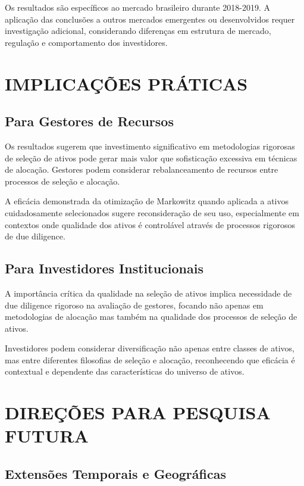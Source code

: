 Os resultados são específicos ao mercado brasileiro durante 2018-2019. A aplicação das conclusões a outros mercados emergentes ou desenvolvidos requer investigação adicional, considerando diferenças em estrutura de mercado, regulação e comportamento dos investidores.

\section{IMPLICAÇÕES PRÁTICAS}

\subsection{Para Gestores de Recursos}

Os resultados sugerem que investimento significativo em metodologias rigorosas de seleção de ativos pode gerar mais valor que sofisticação excessiva em técnicas de alocação. Gestores podem considerar rebalanceamento de recursos entre processos de seleção e alocação.

A eficácia demonstrada da otimização de Markowitz quando aplicada a ativos cuidadosamente selecionados sugere reconsideração de seu uso, especialmente em contextos onde qualidade dos ativos é controlável através de processos rigorosos de due diligence.

\subsection{Para Investidores Institucionais}

A importância crítica da qualidade na seleção de ativos implica necessidade de due diligence rigoroso na avaliação de gestores, focando não apenas em metodologias de alocação mas também na qualidade dos processos de seleção de ativos.

Investidores podem considerar diversificação não apenas entre classes de ativos, mas entre diferentes filosofias de seleção e alocação, reconhecendo que eficácia é contextual e dependente das características do universo de ativos.

\section{DIREÇÕES PARA PESQUISA FUTURA}

\subsection{Extensões Temporais e Geográficas}

